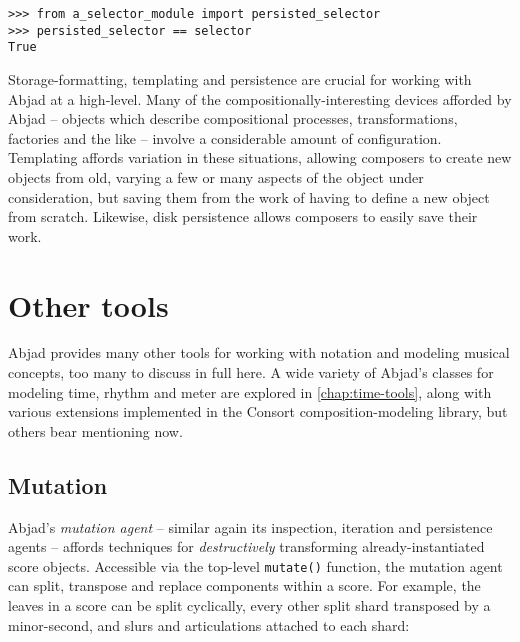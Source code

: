 \begin{abjadbookoutput}
\begin{singlespacing}
\vspace{-0.5\baselineskip}
\begin{verbatim}
>>> from a_selector_module import persisted_selector
>>> persisted_selector == selector
True
\end{verbatim}
\end{singlespacing}
\end{abjadbookoutput}

\noindent Storage-formatting, templating and persistence are crucial for
working with Abjad at a high-level. Many of the compositionally-interesting
devices afforded by Abjad -- objects which describe compositional processes,
transformations, factories and the like -- involve a considerable amount of
configuration. Templating affords variation in these situations, allowing
composers to create new objects from old, varying a few or many aspects of the
object under consideration, but saving them from the work of having to define a
new object from scratch. Likewise, disk persistence allows composers to easily
save their work.

\section{Other tools}
\label{sec:other-tools}

Abjad provides many other tools for working with notation and modeling musical
concepts, too many to discuss in full here. A wide variety of Abjad's classes
for modeling time, rhythm and meter are explored in \autoref{chap:time-tools},
along with various extensions implemented in the Consort composition-modeling
library, but others bear mentioning now.

\subsection{Mutation}
\label{ssec:mutation}

Abjad's \emph{mutation agent} -- similar again its inspection, iteration and
persistence agents -- affords techniques for \emph{destructively} transforming
already-instantiated score objects. Accessible via the top-level
\texttt{mutate()} function, the mutation agent can split, transpose and replace
components within a score. For example, the leaves in a score can be split
cyclically, every other split shard transposed by a minor-second, and slurs and
articulations attached to each shard:

